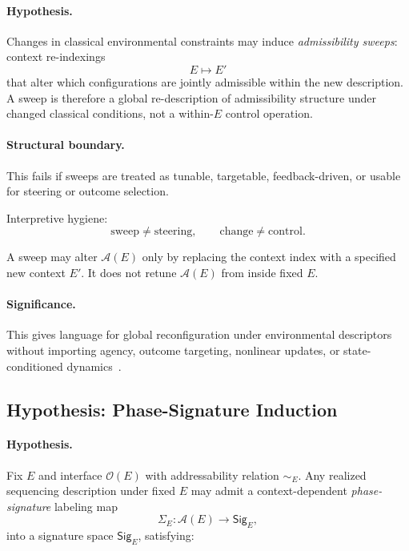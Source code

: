 \documentclass[aps,prx,onecolumn,11pt]{revtex4-2}
\theoremstyle{plain}
\theoremstyle{definition}
\theoremstyle{remark}
\begin{document}
\paragraph{Hypothesis.}

Changes in classical environmental constraints may induce
\emph{admissibility sweeps}: context re-indexings
\[
E\longmapsto E'
\]
that alter which configurations are jointly admissible within the new
description. A sweep is therefore a global re-description of
admissibility structure under changed classical conditions, not a
within-\(E\) control operation.

\paragraph{Structural boundary.}

This fails if sweeps are treated as tunable, targetable,
feedback-driven, or usable for steering or outcome selection.

Interpretive hygiene:
\[
\text{sweep}\neq\text{steering},
\qquad
\text{change}\neq\text{control}.
\]

A sweep may alter \(\mathcal A(E)\) only by replacing the context index
with a specified new context \(E'\). It does not retune
\(\mathcal A(E)\) from inside fixed \(E\).

\paragraph{Significance.}

This gives language for global reconfiguration under environmental
descriptors without importing agency, outcome targeting, nonlinear
updates, or state-conditioned dynamics~\cite{Lindblad1976,Gorini1976,Zurek2003}.

\subsection{Hypothesis: Phase-Signature Induction}
\label{hyp:phase_signature_induction_format}

\paragraph{Hypothesis.}

Fix \(E\) and interface \(\mathcal O(E)\) with addressability relation
\(\sim_E\). Any realized sequencing description under fixed \(E\) may
admit a context-dependent \emph{phase-signature} labeling map
\begin{equation}
\Sigma_E:\mathcal A(E)\longrightarrow \mathsf{Sig}_E,
\label{eq:phase_signature_map_H}
\end{equation}
into a signature space \(\mathsf{Sig}_E\), satisfying:
\end{document}
